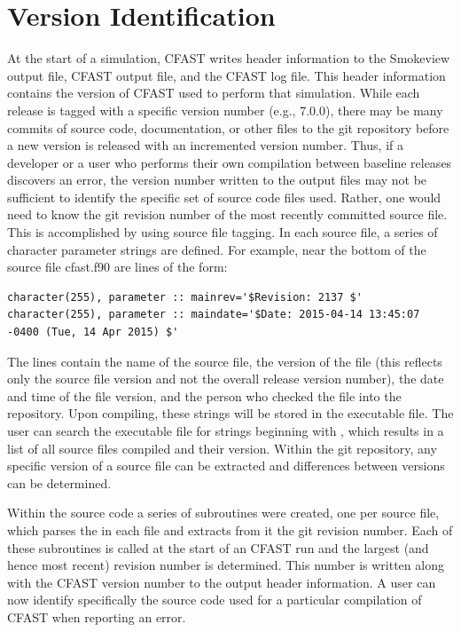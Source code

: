 \documentclass[12pt]{book}
\begin{document}
\section{Version Identification}

At the start of a simulation, CFAST writes header information to the Smokeview output file, CFAST output file, and the CFAST log file.  This header information contains the version of CFAST used to perform that simulation. While each release is tagged with a specific version number (e.g., 7.0.0), there may be many commits of source code, documentation, or other files to the git repository before a new version is released with an incremented version number.  Thus, if a developer or a user who performs their own compilation between baseline releases discovers an error, the version number written to the output files may not be sufficient to identify the specific set of source code files used.  Rather, one would need to know the git revision number of the most recently committed source file. This is accomplished by using source file tagging. In each source file, a series of character parameter strings are defined. For example, near the bottom of the source file {\ct cfast.f90} are lines of the form:
\begin{lstlisting}
character(255), parameter :: mainrev='$Revision: 2137 $'
character(255), parameter :: maindate='$Date: 2015-04-14 13:45:07 -0400 (Tue, 14 Apr 2015) $'
\end{lstlisting}
The lines contain the name of the source file, the version of the file (this reflects only the source file version and not the overall release version number), the date and time of the file version, and the person who checked the file into the repository. Upon compiling, these strings will be stored in the executable file.  The user can search the executable file for strings beginning with , which results in a list of all source files compiled and their version. Within the git repository, any specific version of a source file can be extracted and differences between versions can be determined.

Within the source code a series of subroutines were created, one per source file, which parses the  in each file and extracts from it the git revision number.  Each of these subroutines is called at the start of an CFAST run and the largest (and hence most recent) revision number is determined.  This number is written along with the CFAST version number to the output header information.  A user can now identify specifically the source code used for a particular compilation of CFAST when reporting an error.
\end{document}
